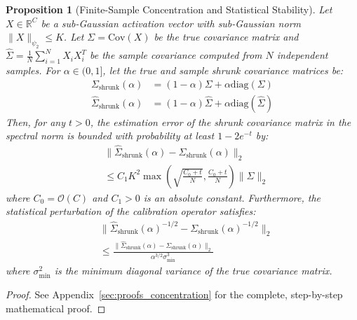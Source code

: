 \documentclass{article}
\theoremstyle{plain}
\newtheorem{proposition}[theorem]{Proposition}
\theoremstyle{definition}
\theoremstyle{remark}
\begin{document}
\begin{proposition}[Finite-Sample Concentration and Statistical Stability]
Let $X \in \mathbb{R}^C$ be a sub-Gaussian activation vector with sub-Gaussian norm $\|X\|_{\psi_2} \leq K$. Let $\Sigma = \text{Cov}(X)$ be the true covariance matrix and $\hat{\Sigma} = \frac{1}{N} \sum_{i=1}^N X_i X_i^T$ be the sample covariance computed from $N$ independent samples. For $\alpha \in (0, 1]$, let the true and sample shrunk covariance matrices be:
\begin{align*}
  \Sigma_{\text{shrunk}}(\alpha) &= (1 - \alpha) \Sigma + \alpha \text{diag}(\Sigma) \\
  \hat{\Sigma}_{\text{shrunk}}(\alpha) &= (1 - \alpha) \hat{\Sigma} + \alpha \text{diag}(\hat{\Sigma})
\end{align*}
Then, for any $t > 0$, the estimation error of the shrunk covariance matrix in the spectral norm is bounded with probability at least $1 - 2 e^{-t}$ by:
\begin{align}
  &\big\| \hat{\Sigma}_{\text{shrunk}}(\alpha) - \Sigma_{\text{shrunk}}(\alpha) \big\|_2 \nonumber \\
  &\leq C_1 K^2 \max\left( \sqrt{\frac{C_0 + t}{N}}, \frac{C_0 + t}{N} \right) \|\Sigma\|_2
\end{align}
where $C_0 = \mathcal{O}(C)$ and $C_1 > 0$ is an absolute constant. Furthermore, the statistical perturbation of the calibration operator satisfies:
\begin{align}
  &\big\| \hat{\Sigma}_{\text{shrunk}}(\alpha)^{-1/2} - \Sigma_{\text{shrunk}}(\alpha)^{-1/2} \big\|_2 \nonumber \\
  &\leq \frac{\big\| \hat{\Sigma}_{\text{shrunk}}(\alpha) - \Sigma_{\text{shrunk}}(\alpha) \big\|_2}{\alpha^{3/2} \sigma_{\min}^3}
\end{align}
where $\sigma_{\min}^2$ is the minimum diagonal variance of the true covariance matrix.
\end{proposition}

\begin{proof}
See Appendix~\ref{sec:proofs_concentration} for the complete, step-by-step mathematical proof.
\end{proof}
\end{document}

